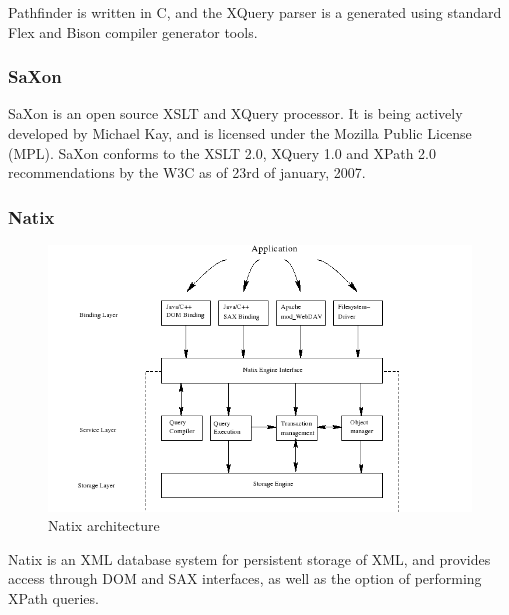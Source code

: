 Pathfinder is written in C, and the XQuery parser is a generated using standard Flex and Bison compiler generator tools.

\subsubsection{SaXon}
SaXon is an open source XSLT and XQuery processor. It is being actively developed by Michael Kay, and is licensed under the Mozilla Public License (MPL). SaXon conforms to the XSLT 2.0, XQuery 1.0 and XPath 2.0 recommendations by the W3C as of 23rd of january, 2007.

\subsubsection{Natix}
\begin{figure}[!h]
  \centering
    \includegraphics[width=1\textwidth]{img/natix_architecture.png}
  \caption{Natix architecture}
\end{figure}
Natix is an XML database system for persistent storage of XML, and provides access through DOM and SAX interfaces, as well as the option of performing XPath queries.